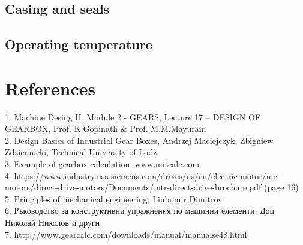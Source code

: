 \documentclass{article}
\begin{document}
\subsection{Casing and seals}
\subsection{Operating temperature}

\section{References}
1. Machine Desing II, Module 2 - GEARS, Lecture 17 – DESIGN OF GEARBOX, Prof. K.Gopinath \& Prof. M.M.Mayuram \\
2. Design Basics of Industrial Gear Boxes, Andrzej Maciejczyk, Zbigniew Zdziennicki, Technical University of Lodz \\
3. Example of gearbox calculation, www.mitcalc.com \\
4. https://www.industry.usa.siemens.com/drives/us/en/electric-motor/mc-motors/direct-drive-motors/Documents/mtr-direct-drive-brochure.pdf  (page 16) \\
5. Principles of mechanical engineering, Liubomir Dimitrov  \\
6. Ръководство за конструктивни упражнения по машинни елементи, Доц Николай Николов и други  \\
7. http://www.gearcalc.com/downloads/manual/manualse48.html  \\

\tableofcontents
\end{document}
